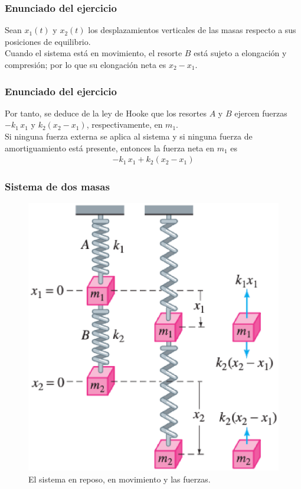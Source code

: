 \begin{frame}
\frametitle{Enunciado del ejercicio}
Sean $x_{1}(t)$ y $x_{2}(t)$ los desplazamientos verticales de las masas respecto a sus posiciones de equilibrio.
\\
\bigskip
\pause
Cuando el sistema está en movimiento, el resorte $B$ está sujeto a elongación y compresión;
por lo que su elongación neta es $x_{2} - x_{1}$.
\end{frame}
\begin{frame}
\frametitle{Enunciado del ejercicio}
Por tanto, se deduce de la ley de Hooke que los resortes $A$ y $B$ ejercen fuerzas $-k_{1} \, x_{1}$ y $k_{2} (x_{2} - x_{1})$, respectivamente, en $m_{1}$.
\\
\bigskip
\pause
Si ninguna fuerza externa se aplica al sistema y si ninguna fuerza de amortiguamiento está
presente, entonces la fuerza neta en $m_{1}$ es
\begin{align*}
-k_{1} \, x_{1} + k_{2} (x_{2} - x_{1})
\end{align*}
\end{frame}
\begin{frame}
\frametitle{Sistema de dos masas}
\begin{figure}
    \centering
    \includegraphics[scale=0.35]{Imagenes/Ejercicio_Dos_Masas_02.eps}
    \caption{El sistema en reposo, en movimiento y las fuerzas.}
    \label{fig:figura_dos_masas_02}
\end{figure}
\end{frame}
